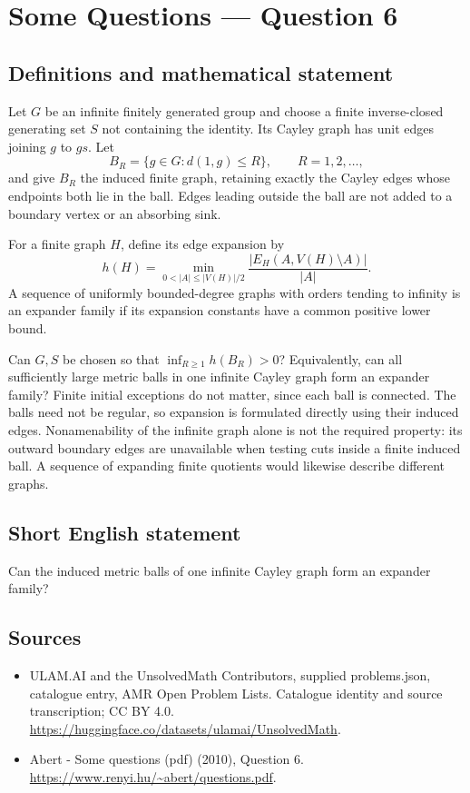 \documentclass[11pt,a4paper]{article}
\begin{document}
\section*{Some Questions — Question 6}\label{statement}

\subsection{Definitions and mathematical statement}
Let $G$ be an infinite finitely generated group and choose a finite inverse-closed generating set $S$ not containing the identity. Its Cayley graph has unit edges joining $g$ to $gs$. Let
\[
 B_R=\{g\in G:d(1,g)\leq R\},\qquad R=1,2,\ldots,
\]
and give $B_R$ the induced finite graph, retaining exactly the Cayley edges whose endpoints both lie in the ball. Edges leading outside the ball are not added to a boundary vertex or an absorbing sink.

For a finite graph $H$, define its edge expansion by
\[
 h(H)=\min_{0<|A|\leq|V(H)|/2}
          \frac{|E_H(A,V(H)\setminus A)|}{|A|}.
\]
A sequence of uniformly bounded-degree graphs with orders tending to infinity is an expander family if its expansion constants have a common positive lower bound.

Can $G,S$ be chosen so that $\inf_{R\geq1}h(B_R)>0$? Equivalently, can all sufficiently large metric balls in one infinite Cayley graph form an expander family? Finite initial exceptions do not matter, since each ball is connected. The balls need not be regular, so expansion is formulated directly using their induced edges. Nonamenability of the infinite graph alone is not the required property: its outward boundary edges are unavailable when testing cuts inside a finite induced ball. A sequence of expanding finite quotients would likewise describe different graphs.
\subsection{Short English statement}
Can the induced metric balls of one infinite Cayley graph form an expander family?
\subsection{Sources}
\begin{itemize}
\item[S1] ULAM.AI and the UnsolvedMath Contributors, supplied problems.json, catalogue entry, AMR Open Problem Lists. Catalogue identity and source transcription; CC BY 4.0.
\url{https://huggingface.co/datasets/ulamai/UnsolvedMath}.
\item[S2] Abert - Some questions (pdf) (2010), Question 6. 
\url{https://www.renyi.hu/~abert/questions.pdf}.
\end{itemize}
\end{document}

